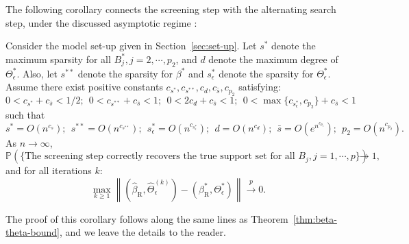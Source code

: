 
The following corollary connects the screening step with the alternating search step, under the discussed asymptotic regime : 
\begin{corollary}\label{cor:connection1}
Consider the model set-up given in Section~\ref{sec:set-up}. Let $s^*$ denote the maximum sparsity for all $B^*_j, j=2,\cdots,p_2$, and $d$ denote the maximum degree of $\Theta^*_\epsilon$. Also, let $s^{**}$ denote the sparsity for $\beta^*$ and $s^*_\epsilon$ denote the sparsity for $\Theta^*_\epsilon$. Assume there exist positive constants $c_{s^*},c_{s^{**}}, c_d, c_{\bar{s}},c_{p_2}$ satisfying:
\begin{equation*}
0<c_{s^*}+c_{\bar{s}}<1/2; ~~ 0<c_{s^{**}}+ c_{\bar{s}} <1; ~~ 0<2c_{d}+c_{\bar{s}} <1;~~ 0< \max\{c_{s^*_\epsilon},c_{p_2}\}+ c_{\bar{s}}<1
\end{equation*}
such that 
\begin{equation*}
s^*=O(n^{c_s});~~ s^{**}=O(n^{c_{s^{**}}}); ~~ s_\epsilon^*=O(n^{c_{s^*_\epsilon}});~~  d=O(n^{c_d});~~ \bar{s} = O(e^{n^{c_{p_1}}}); ~~ p_2 = O(n^{c_{p_2}}).
\end{equation*}
As $n\rightarrow\infty$, 
\begin{equation*}
\mathbb{P}\left( \{\text{The screening step correctly recovers the true support set for all $B_j,j=1,\cdots,p$} \}\right) \rightarrow 1, 
\end{equation*}
and for all iterations $k$:
\begin{equation*}
\max\limits_{k\geq 1} \left\|(\widehat{\beta}_{\mathrm{R}},\widehat{\Theta}_\epsilon^{(k)}) - (\beta^*_{\mathrm{R}},\Theta^*_\epsilon)\right\| \stackrel{p}{\rightarrow} 0.
\end{equation*}
\end{corollary}
The proof of this corollary follows along the same lines as Theorem~\ref{thm:beta-theta-bound}, and we leave the details to the reader. 

